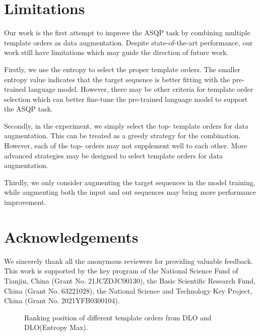 \documentclass[11pt]{article}
\begin{document}
\section*{Limitations}
Our work is the first attempt to improve the ASQP task by combining multiple template orders as data augmentation. Despite state-of-the-art performance, our work still have limitations which may guide the direction of future work.

Firstly, we use the entropy to select the proper template orders. The smaller entropy value indicates that the target sequence is better fitting with the pre-trained language model. However, there may be other criteria for template order selection which can better fine-tune the pre-trained language model to support the ASQP task. 

Secondly, in the experiment, we simply select the top- template orders for data augmentation. This can be treated as a greedy strategy for the combination. However, each of the top- orders may not supplement well to each other. More advanced strategies may be designed to select template orders for data augmentation. 



Thirdly, we only consider augmenting the target sequences in the model training, while augmenting both the input and out sequences may bring more performance improvement.  





\section*{Acknowledgements}
We sincerely thank all the anonymous reviewers for providing valuable feedback. This work is supported by the key program of the National Science Fund of Tianjin, China (Grant No. 21JCZDJC00130), the Basic Scientific Research Fund, China (Grant No. 63221028), the National Science and Technology Key Project, China (Grant No. 2021YFB0300104).




\clearpage
\appendix



\begin{figure}[t]
\centering
{}
\caption{Ranking position of different template orders from DLO and DLO(Entropy Max).}
\label{fig:figure_DLO}
\end{figure}
\end{document}
